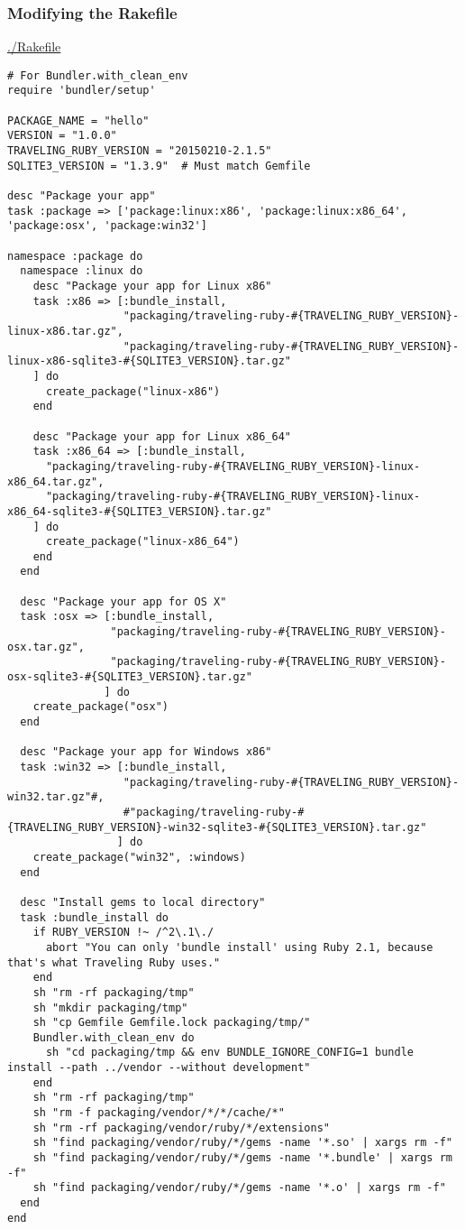 \documentclass[11pt]{article}
\begin{document}
\subsubsection{Modifying the Rakefile}
\label{sec-2-1-3}

\url{./Rakefile}

\begin{verbatim}
# For Bundler.with_clean_env
require 'bundler/setup'

PACKAGE_NAME = "hello"
VERSION = "1.0.0"
TRAVELING_RUBY_VERSION = "20150210-2.1.5"
SQLITE3_VERSION = "1.3.9"  # Must match Gemfile

desc "Package your app"
task :package => ['package:linux:x86', 'package:linux:x86_64', 'package:osx', 'package:win32']

namespace :package do
  namespace :linux do
    desc "Package your app for Linux x86"
    task :x86 => [:bundle_install,
                  "packaging/traveling-ruby-#{TRAVELING_RUBY_VERSION}-linux-x86.tar.gz",
                  "packaging/traveling-ruby-#{TRAVELING_RUBY_VERSION}-linux-x86-sqlite3-#{SQLITE3_VERSION}.tar.gz"
    ] do
      create_package("linux-x86")
    end

    desc "Package your app for Linux x86_64"
    task :x86_64 => [:bundle_install,
      "packaging/traveling-ruby-#{TRAVELING_RUBY_VERSION}-linux-x86_64.tar.gz",
      "packaging/traveling-ruby-#{TRAVELING_RUBY_VERSION}-linux-x86_64-sqlite3-#{SQLITE3_VERSION}.tar.gz"
    ] do
      create_package("linux-x86_64")
    end
  end

  desc "Package your app for OS X"
  task :osx => [:bundle_install,
                "packaging/traveling-ruby-#{TRAVELING_RUBY_VERSION}-osx.tar.gz",
                "packaging/traveling-ruby-#{TRAVELING_RUBY_VERSION}-osx-sqlite3-#{SQLITE3_VERSION}.tar.gz"
               ] do
    create_package("osx")
  end

  desc "Package your app for Windows x86"
  task :win32 => [:bundle_install,
                  "packaging/traveling-ruby-#{TRAVELING_RUBY_VERSION}-win32.tar.gz"#,
                  #"packaging/traveling-ruby-#{TRAVELING_RUBY_VERSION}-win32-sqlite3-#{SQLITE3_VERSION}.tar.gz"
                 ] do
    create_package("win32", :windows)
  end

  desc "Install gems to local directory"
  task :bundle_install do
    if RUBY_VERSION !~ /^2\.1\./
      abort "You can only 'bundle install' using Ruby 2.1, because that's what Traveling Ruby uses."
    end
    sh "rm -rf packaging/tmp"
    sh "mkdir packaging/tmp"
    sh "cp Gemfile Gemfile.lock packaging/tmp/"
    Bundler.with_clean_env do
      sh "cd packaging/tmp && env BUNDLE_IGNORE_CONFIG=1 bundle install --path ../vendor --without development"
    end
    sh "rm -rf packaging/tmp"
    sh "rm -f packaging/vendor/*/*/cache/*"
    sh "rm -rf packaging/vendor/ruby/*/extensions"
    sh "find packaging/vendor/ruby/*/gems -name '*.so' | xargs rm -f"
    sh "find packaging/vendor/ruby/*/gems -name '*.bundle' | xargs rm -f"
    sh "find packaging/vendor/ruby/*/gems -name '*.o' | xargs rm -f"
  end
end


\end{verbatim}
\end{document}
